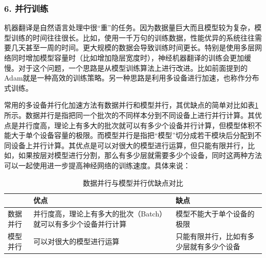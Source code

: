 \subsubsection{6. 并行训练}

\parinterval 机器翻译是自然语言处理中很“重”的任务。因为数据量巨大而且模型较为复杂，模型训练的时间往往很长。比如，使用一千万句的训练数据，性能优异的系统往往需要几天甚至一周的时间。更大规模的数据会导致训练时间更长。特别是使用多层网络同时增加模型容量时（比如增加隐层宽度时），神经机器翻译的训练会更加缓慢。对于这个问题，一个思路是从模型训练算法上进行改进。比如前面提到的Adam就是一种高效的训练策略。另一种思路是利用多设备进行加速，也称作分布式训练。

\parinterval 常用的多设备并行化加速方法有数据并行和模型并行，其优缺点的简单对比如表\ref{tab:10-9}所示。数据并行是指把同一个批次的不同样本分到不同设备上进行并行计算。其优点是并行度高，理论上有多大的批次就可以有多少个设备并行计算，但模型体积不能大于单个设备容量的极限。而模型并行是指把“模型”切分成若干模块后分配到不同设备上并行计算。其优点是可以对很大的模型进行运算，但只能有限并行，比如，如果按层对模型进行分割，那么有多少层就需要多少个设备，同时这两种方法可以一起使用进一步提高神经网络的训练速度。具体来说：

\vspace{-0.5em}
\begin{table}[htp]
\centering
\caption{ 数据并行与模型并行优缺点对比}
\label{tab:10-9}
\begin{tabular}{l | p{12em}  p{12em} }
	 		 &优点		&缺点 \\ \hline
\rule{0pt}{15pt}	数据并行 &并行度高，理论上有多大的批次（Batch）就可以有多少个设备并行计算	&模型不能大于单个设备的极限 \\
\rule{0pt}{15pt}	模型并行	&可以对很大的模型进行运算	&只能有限并行，比如有多少层就有多少个设备 \\
\end{tabular}
\end{table}

